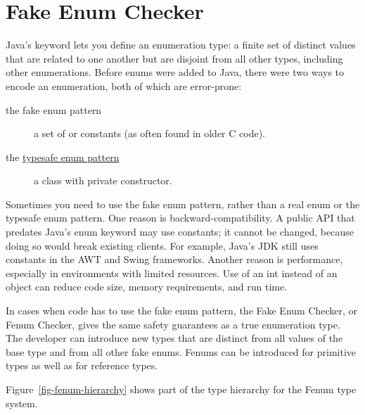 \htmlhr
\chapter{Fake Enum Checker\label{fenum-checker}}

Java's
\href{https://docs.oracle.com/javase/specs/jls/se8/html/jls-8.html#jls-8.9}{}
keyword lets you define an enumeration type: a finite set of distinct values
that are related to one another but are disjoint from all other
types, including other enumerations.
Before enums were added to Java, there were two ways to encode an
enumeration, both of which are error-prone:

\begin{description}
\item[the fake enum pattern]  a set of  or 
  constants (as often found in older C code).

\item[the \href{http://www.oracle.com/technetwork/java/page1-139488.html}{typesafe
enum pattern}]  a class with private constructor.
\end{description}

Sometimes you need to use the fake enum pattern,
rather than a real enum or the typesafe enum pattern.
%
One reason is backward-compatibility.  A public API that predates Java's
enum keyword may use  constants; it cannot be changed, because
doing so would break existing clients.  For example, Java's JDK still uses
 constants in the AWT and Swing frameworks.
%
Another reason is performance, especially in environments with limited
resources.  Use of an int instead of an object can
reduce code size, memory requirements, and run time.

In cases when code has to use the fake enum pattern, the Fake Enum Checker,
or Fenum Checker, gives the same safety guarantees as a true enumeration type.
The developer can introduce new types that are distinct from all values of the
base type and from all other fake enums. Fenums can be introduced for
primitive types as well as for reference types.

Figure~\ref{fig-fenum-hierarchy} shows part of the type hierarchy for the
Fenum type system.

